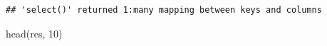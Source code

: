 \documentclass[
]{article}
\newenvironment{Shaded}{\begin{snugshade}}{\end{snugshade}}
\newcommand{\AttributeTok}[1]{\textcolor[rgb]{0.77,0.63,0.00}{#1}}
\newcommand{\DecValTok}[1]{\textcolor[rgb]{0.00,0.00,0.81}{#1}}
\newcommand{\FunctionTok}[1]{\textcolor[rgb]{0.00,0.00,0.00}{#1}}
\newcommand{\NormalTok}[1]{#1}
\newcommand{\OtherTok}[1]{\textcolor[rgb]{0.56,0.35,0.01}{#1}}
\newcommand{\SpecialCharTok}[1]{\textcolor[rgb]{0.00,0.00,0.00}{#1}}
\newcommand{\StringTok}[1]{\textcolor[rgb]{0.31,0.60,0.02}{#1}}
\begin{document}
\begin{Shaded}
\end{Shaded}

\begin{verbatim}
## 'select()' returned 1:many mapping between keys and columns
\end{verbatim}

\begin{Shaded}
\begin{Highlighting}[]
\FunctionTok{head}\NormalTok{(res, }\DecValTok{10}\NormalTok{)}
\end{Highlighting}
\end{Shaded}
\end{document}

